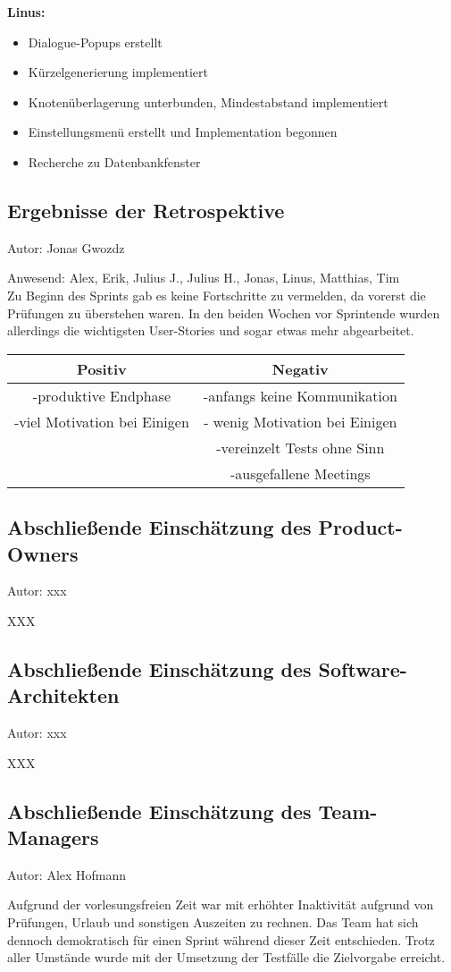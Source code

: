 \textbf{Linus:}
\begin{itemize}
\item Dialogue-Popups erstellt
\item Kürzelgenerierung implementiert
\item Knotenüberlagerung unterbunden, Mindestabstand implementiert
\item Einstellungsmenü erstellt und Implementation begonnen
\item Recherche zu Datenbankfenster
\end{itemize}

\subsection{Ergebnisse der Retrospektive}
{\small Autor: Jonas Gwozdz}

Anwesend: Alex, Erik, Julius J., Julius H., Jonas, Linus, Matthias, Tim\\

Zu Beginn des Sprints gab es keine Fortschritte zu vermelden, da vorerst die Prüfungen zu überstehen waren. In den beiden Wochen vor Sprintende wurden allerdings die wichtigsten User-Stories und sogar etwas mehr abgearbeitet.\\

\begin{center}
\begin{tabular}{ |c|c| }
\hline
 Positiv & Negativ \\
\hline 
 -produktive Endphase & -anfangs keine Kommunikation \\
 -viel Motivation bei Einigen & - wenig Motivation bei Einigen\\
 & -vereinzelt Tests ohne Sinn\\
 & -ausgefallene Meetings\\
\hline     
\end{tabular}
\end{center}
 

\subsection{Abschließende Einschätzung des Product-Owners}
{\small Autor: xxx}

XXX

\subsection{Abschließende Einschätzung des Software-Architekten}
{\small Autor: xxx}

XXX

\subsection{Abschließende Einschätzung des Team-Managers}
{\small Autor: Alex Hofmann}

Aufgrund der vorlesungsfreien Zeit war mit erhöhter Inaktivität aufgrund von Prüfungen, Urlaub und sonstigen Auszeiten zu rechnen.
Das Team hat sich dennoch demokratisch für einen Sprint während dieser Zeit entschieden. Trotz aller Umstände wurde mit der Umsetzung der Testfälle die Zielvorgabe erreicht.

